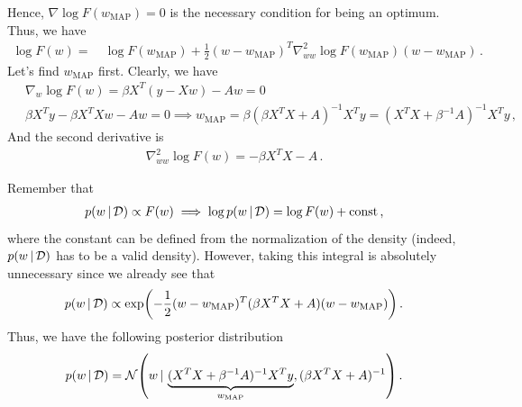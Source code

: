 Hence, $\nabla \log F(w_{\text{MAP}}) = 0$ is the necessary condition for being an optimum.
Thus, we have
\begin{align}
    \log F(w) =~& \log F(w_{\text{MAP}}) +\frac{1}{2} (w - w_{\text{MAP}})^T \nabla^2_{ww} \log F(w_{\text{MAP}}) (w - w_{\text{MAP}})\,.
\end{align}
Let's find $w_{\text{MAP}}$ first.
Clearly, we have
\begin{align}
    ~&\nabla_w \log F(w) = \beta X^T(y-Xw) - A w = 0\\
    ~&\beta X^Ty - \beta X^TX w - Aw  = 0 \implies w_{\text{MAP}} = \beta(\beta X^TX + A)^{-1}X^Ty = (X^TX + \beta^{-1}A)^{-1}X^Ty\,,
\end{align}
And the second derivative is
\begin{align}
    \nabla^2_{ww} \log F(w) = - \beta X^TX - A\,.
\end{align}

Remember that 
\begin{align}
    p(w\,|\, \mathcal{D}) \propto F(w) \implies \log p(w\,|\, \mathcal{D}) = \log F(w) + \text{const}\,,
\end{align}
where the constant can be defined from the normalization of the density (indeed, $p(w\,|\, \mathcal{D})$ has to be a valid density).
However, taking this integral is absolutely unnecessary since we already see that 
\begin{align}
    p(w\cond \mathcal{D}) \propto \exp\left( - \frac{1}{2} (w - w_{\text{MAP}})^T(\beta X^TX + A) (w - w_{\text{MAP}})\right)\,.
\end{align}
Thus, we have the following posterior distribution
\begin{align}
    p(w\cond \mathcal{D}) = \Normal\left(w\cond \underbrace{(X^TX + \beta^{-1}A)^{-1}X^Ty}_{w_{\text{MAP}}}, (\beta X^TX + A)^{-1}\right)\,.
\end{align}

